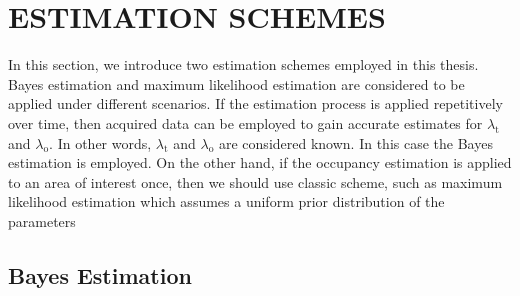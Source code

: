 \chapter{ESTIMATION SCHEMES}
In this section, we introduce two estimation schemes employed in this thesis. Bayes estimation and maximum likelihood estimation are considered to be applied under different scenarios. If the estimation process is applied repetitively over time, then acquired data can be employed to gain accurate estimates for $\lambda_{\mathrm{t}}$ and $\lambda_{\mathrm{o}}$. In other words, $\lambda_{\mathrm{t}}$ and $\lambda_{\mathrm{o}}$ are considered known. In this case the Bayes estimation is employed. On the other hand, if the occupancy estimation is applied to an area of interest once, then we should use classic scheme, such as maximum likelihood estimation which assumes a uniform prior distribution of the parameters

\section{Bayes Estimation} \label{section:BayesEstimation}

